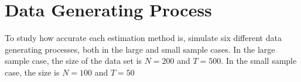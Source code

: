 
\section{Data Generating Process} \label{sec::dgp}

To study how accurate each estimation method is, \cite{carrasco2016sample} simulate six different data generating processes, both in the large and small sample cases. In the large sample case, the size of the data set is $N = 200$ and $T = 500$. In the small sample case, the size is $N = 100$ and $T = 50$





